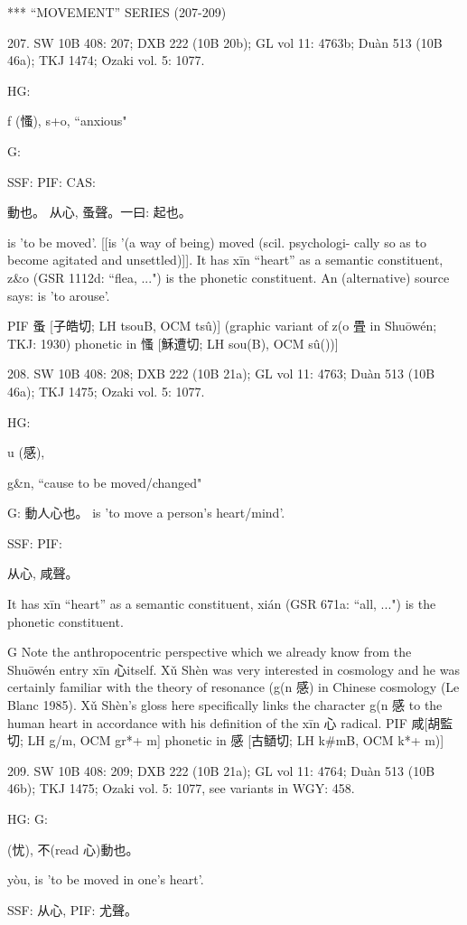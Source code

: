 {             *** ``MOVEMENT'' SERIES (207-209)

207. SW 10B 408: 207; DXB 222 (10B 20b); GL vol 11: 4763b; Duàn 513 (10B 46a); TKJ 1474; Ozaki vol. 5: 1077.


HG:

ƒ (慅), s+o, ``anxious"

G:

SSF: PIF: CAS:

動也。
从心, 蚤聲。一曰: 起也。

is 'to be moved'. [[is '(a way of being) moved (scil. psychologi- cally so as to become agitated and unsettled)]].
It has xīn ``heart'' as a semantic constituent,
z&o (GSR 1112d: ``flea, ...") is the phonetic constituent. An (alternative) source says:
is 'to arouse'.

PIF     蚤 [子皓切; LH tsouB, OCM tsû)] (graphic variant of z(o 畳 in Shuōwén; TKJ: 1930) phonetic in 慅 [穌遭切; LH sou(B), OCM sû())]

208. SW 10B 408: 208; DXB 222 (10B 21a); GL vol 11: 4763; Duàn 513 (10B 46a); TKJ 1475; Ozaki vol. 5: 1077.


HG:

u (感),


g&n, ``cause to be moved/changed"

G:	動人心也。 is 'to move a person's heart/mind'.

SSF: PIF:

从心, 咸聲。

It has xīn ``heart'' as a semantic constituent,
xián (GSR 671a: ``all, ...") is the phonetic constituent.

G Note the anthropocentric perspective which we already know from the Shuōwén entry xīn 心itself. Xǔ Shèn was very interested in cosmology and he was certainly familiar with the theory of resonance (g(n 感) in Chinese cosmology (Le Blanc 1985).
Xǔ Shèn's gloss here specifically links the character g(n 感 to the human heart in accordance
with his definition of the xīn 心 radical.
PIF  咸[胡監切; LH g/m, OCM gr*+ m] phonetic in 感 [古䲤切; LH k\#mB, OCM k*+ m)]

209. SW 10B 408: 209; DXB 222 (10B 21a); GL vol 11: 4764; Duàn 513 (10B 46b); TKJ 1475; Ozaki vol. 5: 1077, see
variants in WGY: 458.


HG:
G:

(忧),
不(read 心)動也。

yòu,
is 'to be moved in one's heart'.

SSF: 从心,
PIF: 尤聲。

}

